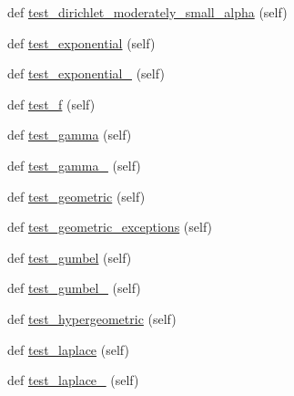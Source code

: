 \begin{DoxyCompactItemize}
def \hyperlink{classnumpy_1_1random_1_1tests_1_1test__generator__mt19937_1_1TestRandomDist_a85b6102f79fba5f7ad6a8ebffc9c7913}{test\+\_\+dirichlet\+\_\+moderately\+\_\+small\+\_\+alpha} (self)
\item 
def \hyperlink{classnumpy_1_1random_1_1tests_1_1test__generator__mt19937_1_1TestRandomDist_a73716ae1f2c7fb53bef41669d1e0a2ed}{test\+\_\+exponential} (self)
\item 
def \hyperlink{classnumpy_1_1random_1_1tests_1_1test__generator__mt19937_1_1TestRandomDist_a5a94f15e72ad087ae2ee4819cc68fcdc}{test\+\_\+exponential\+\_} (self)
\item 
def \hyperlink{classnumpy_1_1random_1_1tests_1_1test__generator__mt19937_1_1TestRandomDist_a29a740553d200dc514cb27c702b98e08}{test\+\_\+f} (self)
\item 
def \hyperlink{classnumpy_1_1random_1_1tests_1_1test__generator__mt19937_1_1TestRandomDist_a523980ce7ae89f00525040a3759bdc66}{test\+\_\+gamma} (self)
\item 
def \hyperlink{classnumpy_1_1random_1_1tests_1_1test__generator__mt19937_1_1TestRandomDist_a7498dffcdc8d8bea8774916f118f20d6}{test\+\_\+gamma\+\_} (self)
\item 
def \hyperlink{classnumpy_1_1random_1_1tests_1_1test__generator__mt19937_1_1TestRandomDist_af39b1ffc16db18f5c239269845a5e209}{test\+\_\+geometric} (self)
\item 
def \hyperlink{classnumpy_1_1random_1_1tests_1_1test__generator__mt19937_1_1TestRandomDist_a4052fd9608413c3d503038483158450c}{test\+\_\+geometric\+\_\+exceptions} (self)
\item 
def \hyperlink{classnumpy_1_1random_1_1tests_1_1test__generator__mt19937_1_1TestRandomDist_a52f9dc8280b294f1b51b5e18648ffb18}{test\+\_\+gumbel} (self)
\item 
def \hyperlink{classnumpy_1_1random_1_1tests_1_1test__generator__mt19937_1_1TestRandomDist_a8ec8b120e805f3def74f3392c097079d}{test\+\_\+gumbel\+\_} (self)
\item 
def \hyperlink{classnumpy_1_1random_1_1tests_1_1test__generator__mt19937_1_1TestRandomDist_a05cd7d7608622c9bb0c80d5c456ac14e}{test\+\_\+hypergeometric} (self)
\item 
def \hyperlink{classnumpy_1_1random_1_1tests_1_1test__generator__mt19937_1_1TestRandomDist_aab7f0876c2a97dbb5a193ebb46956923}{test\+\_\+laplace} (self)
\item 
def \hyperlink{classnumpy_1_1random_1_1tests_1_1test__generator__mt19937_1_1TestRandomDist_a559981799cd6dd255ca95e7bc8835a13}{test\+\_\+laplace\+\_} (self)

\end{DoxyCompactItemize}
